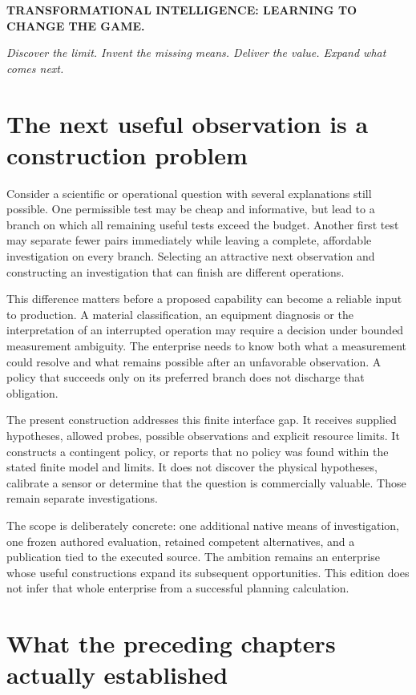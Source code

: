 \documentclass[10pt,letterpaper]{article}
\begin{document}
\textbf{TRANSFORMATIONAL INTELLIGENCE: LEARNING TO CHANGE THE GAME.}

\emph{Discover the limit. Invent the missing means. Deliver the value.
Expand what comes next.}

\hypertarget{the-next-useful-observation-is-a-construction-problem}{%
\section{The next useful observation is a construction
problem}\label{the-next-useful-observation-is-a-construction-problem}}

Consider a scientific or operational question with several explanations
still possible. One permissible test may be cheap and informative, but
lead to a branch on which all remaining useful tests exceed the budget.
Another first test may separate fewer pairs immediately while leaving a
complete, affordable investigation on every branch. Selecting an
attractive next observation and constructing an investigation that can
finish are different operations.

This difference matters before a proposed capability can become a
reliable input to production. A material classification, an equipment
diagnosis or the interpretation of an interrupted operation may require
a decision under bounded measurement ambiguity. The enterprise needs to
know both what a measurement could resolve and what remains possible
after an unfavorable observation. A policy that succeeds only on its
preferred branch does not discharge that obligation.

The present construction addresses this finite interface gap. It
receives supplied hypotheses, allowed probes, possible observations and
explicit resource limits. It constructs a contingent policy, or reports
that no policy was found within the stated finite model and limits. It
does not discover the physical hypotheses, calibrate a sensor or
determine that the question is commercially valuable. Those remain
separate investigations.

The scope is deliberately concrete: one additional native means of
investigation, one frozen authored evaluation, retained competent
alternatives, and a publication tied to the executed source. The
ambition remains an enterprise whose useful constructions expand its
subsequent opportunities. This edition does not infer that whole
enterprise from a successful planning calculation.

\hypertarget{what-the-preceding-chapters-actually-established}{%
\section{What the preceding chapters actually
established}\label{what-the-preceding-chapters-actually-established}}
\end{document}

